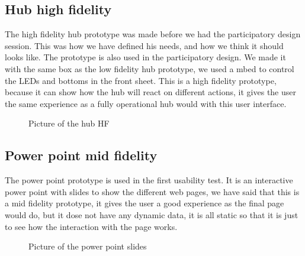 \subsection{Hub high fidelity}
The high fidelity hub prototype was made before we had the participatory design session. This was how we have defined his needs, and how we think it should looks like. The prototype is also used in the participatory design. We made it with the same box as the low fidelity hub prototype, we used a mbed to control the LEDs and bottoms in the front sheet. This is a high fidelity prototype, because it can show how the hub will react on different actions, it gives the user the same experience as a fully operational hub would with this user interface.
\begin{figure}[h!]
	\center
		\setlength\fboxsep{0pt}
		\setlength\fboxrule{1pt}
   	\caption{Picture of the hub HF}
   	\label{fig:High fidelity hub}
\end{figure}

\subsection{Power point mid fidelity}
The power point prototype is used in the first usability test. It is an interactive power point with slides to show the different web pages, we have said that this is a mid fidelity prototype, it gives the user a good experience as the final page would do, but it dose not have any dynamic data, it is all static so that it is just to see how the interaction with the page works.
\begin{figure}[h!]
	\center
		\setlength\fboxsep{0pt}
		\setlength\fboxrule{1pt}
   	\caption{Picture of the power point slides}
   	\label{fig:web_interface1}
\end{figure}

